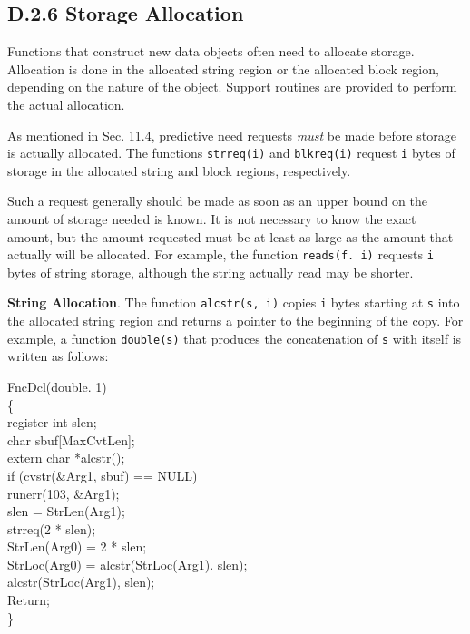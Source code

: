 \subsection[D.2.6 Storage Allocation]{D.2.6 Storage Allocation}

Functions that construct new data objects often need to allocate
storage. Allocation is done in the allocated string region or the
allocated block region, depending on the nature of the object. Support
routines are provided to perform the actual allocation.

As mentioned in Sec. 11.4, predictive need requests \textit{must} be made
before storage is actually allocated. The functions \texttt{strreq(i)} and
\texttt{blkreq(i)} request \texttt{i} bytes of storage in the allocated
string and block regions, respectively.

Such a request generally should be made as soon as an upper bound on the
amount of storage needed is known. It is not necessary to know the exact
amount, but the amount requested must be at least as large as the amount
that actually will be allocated. For example, the function
\texttt{reads(f. i)} requests \texttt{i} bytes of string storage, although
the string actually read may be shorter.

\textbf{String Allocation}. The function \texttt{alcstr(s, i)} copies
\texttt{i} bytes starting at \texttt{s} into the allocated string region
and returns a pointer to the beginning of the copy. For example, a function
\texttt{double(s)} that produces the concatenation of \texttt{s} with
itself is written as follows:
\goodbreak
\begin{iconcode}
\color{red}FncDcl(double. 1)\\
\{\\
\>register int slen;\\
\>char sbuf[MaxCvtLen];\\
\>extern char *alcstr();\\
\>if (cvstr(\&Arg1, sbuf) == NULL)\\
\>\>runerr(103, \&Arg1);\\
\>slen = StrLen(Arg1);\\
\>strreq(2 * slen);\\
\>StrLen(Arg0) = 2 * slen;\\
\>StrLoc(Arg0) = alcstr(StrLoc(Arg1). slen);\\
\>alcstr(StrLoc(Arg1), slen);\\
\>Return;\\
\}
\end{iconcode}

